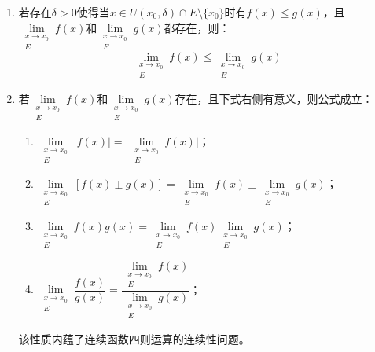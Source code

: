 \begin{property}
\begin{enumerate}
\begin{equation*}
			\lim_{\substack{x\to x_0 \\ E}}f(x)<\lim_{\substack{x\to x_0 \\ E}}g(x)
		\end{equation*}
		则存在$\delta>0$，使得当$x\in U(x_0,\delta)\cap E\setminus\{x_0\}$时，$f(x)<g(x)$；
		\item 若存在$\delta>0$使得当$x\in U(x_0,\delta)\cap E\setminus\{x_0\}$时有$f(x)\leqslant g(x)$，且$\lim\limits_{\substack{x\to x_0 \\ E}}f(x)$和$\lim\limits_{\substack{x\to x_0 \\ E}}g(x)$都存在，则：
		\begin{equation*}
			\lim_{\substack{x\to x_0 \\ E}}f(x)\leqslant\lim_{\substack{x\to x_0 \\ E}}g(x)
		\end{equation*}
		\item 若$\lim\limits_{\substack{x\to x_0 \\ E}}f(x)$和$\lim\limits_{\substack{x\to x_0 \\ E}}g(x)$存在，且下式右侧有意义，则公式成立：
		\begin{enumerate}
			\item $\lim\limits_{\substack{x\to x_0 \\ E}}|f(x)|=\Big|\lim\limits_{\substack{x\to x_0 \\ E}}f(x)\Big|$；
			\item $\lim\limits_{\substack{x\to x_0 \\ E}}[f(x)\pm g(x)]=\lim\limits_{\substack{x\to x_0 \\ E}}f(x)\pm\lim\limits_{\substack{x\to x_0 \\ E}}g(x)$；
			\item $\lim\limits_{\substack{x\to x_0 \\ E}}f(x)g(x)=\lim\limits_{\substack{x\to x_0 \\ E}}f(x)\lim\limits_{\substack{x\to x_0 \\ E}}g(x)$；
			\item $\lim\limits_{\substack{x\to x_0 \\ E}}\dfrac{f(x)}{g(x)}=\dfrac{\lim\limits_{\substack{x\to x_0 \\ E}}f(x)}{\lim\limits_{\substack{x\to x_0 \\ E}}g(x)}$；
		\end{enumerate}
		该性质内蕴了连续函数四则运算的连续性问题。
	\end{enumerate}
\end{property}
